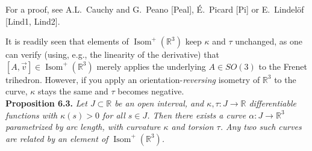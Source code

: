 \documentclass[leqno]{book}
\begin{document}
\noindent For a proof, see A.L.~Cauchy and G.~Peano [Peal], \'E.~Picard [Pi] or E.~Lindel\"of [Lind1, Lind2]. %

It is readily seen that elements of $\operatorname{Isom}^+(\mathbb R^3)$ keep $\kappa$ and $\tau$ unchanged, as one can verify (using, e.g., the linearity of the derivative) that $[A,\vec v]\in\operatorname{Isom}^+(\mathbb R^3)$ merely applies the underlying $A\in SO(3)$ to the Frenet trihedron.  However, if you apply an orientation-\emph{reversing} isometry of $\mathbb R^3$ to the curve, $\kappa$ stays the same and $\tau$ becomes negative.\\

\noindent\textbf{Proposition 6.3.} \emph{Let $J\subset\mathbb R$ be an open interval, and $\kappa,\tau:J\to\mathbb R$ differentiable functions with $\kappa(s)>0$ for all $s\in J$.  Then there exists a curve $\alpha:J\to\mathbb R^3$ parametrized by arc length, with curvature $\kappa$ and torsion $\tau$.  Any two such curves are related by an element of $\operatorname{Isom}^+(\mathbb R^3)$.}
\end{document}
